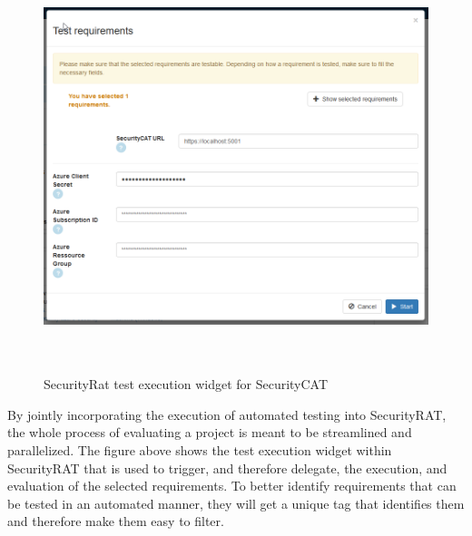\begin{figure}[ht!]
\begin{center}
\includegraphics[height=12cm]{secrat_test_requirements_widget.png}
\end{center}
\caption[SecurityRat test execution widget for SecurityCAT]{SecurityRat test execution widget for SecurityCAT}
\label{fig_devsecops}
\end{figure}

By jointly incorporating the execution of automated testing into SecurityRAT, the whole process of evaluating a project is meant to be streamlined and parallelized. The figure above shows the test execution widget within SecurityRAT that is used to trigger, and therefore delegate, the execution, and evaluation of the selected requirements. 
To better identify requirements that can be tested in an automated manner, they will get a unique tag that identifies them and therefore make them easy to filter.